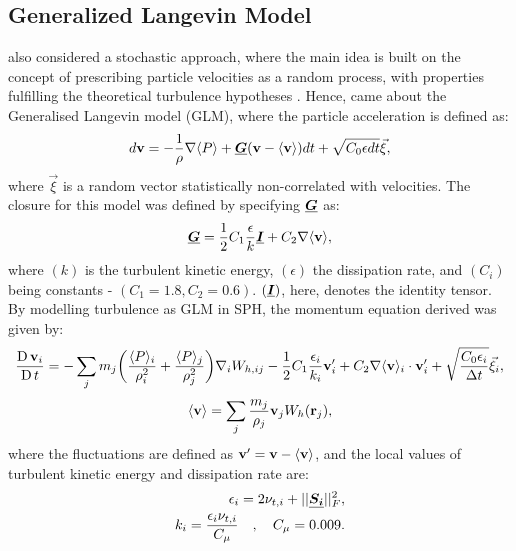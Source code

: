 \subsection{Generalized Langevin Model}
\cite{VIOLEAU2002} also considered a stochastic approach, where the main idea is built on the concept of prescribing particle velocities as a random process, with properties fulfilling the theoretical turbulence hypotheses \parencite{pope1994lagrangi}. Hence, came about the Generalised Langevin model (GLM), where the particle acceleration is defined as:
\begin{equation}
    d\mathbf{v} = -\frac{1}{\rho} \nabla \langle P \rangle + \underline{\bm{G}}(\mathbf{v} - \langle \mathbf{v} \rangle)dt + \sqrt{C_0 \epsilon dt}\Vec{\xi},
    \label{eq:violeau-glm-particle-accel}
\end{equation}
where $\Vec{\xi}$ is a random vector statistically non-correlated with velocities. The closure for this model was defined by specifying $\underline{\bm{G}}$ as:
\begin{equation}
    \underline{\bm{G}} = \frac{1}{2} C_1 \frac{\epsilon}{k}\underline{\bm{I}} + C_2 \nabla \langle \mathbf{v} \rangle,
\end{equation}
where $(k)$ is the turbulent kinetic energy, $(\epsilon)$ the dissipation rate, and $(C_i)$ being constants - $(C_1=1.8, C_2=0.6)$. $(\underline{\bm{I}})$, here, denotes the identity tensor.
By modelling turbulence as GLM in SPH, the momentum equation derived was given by:
\begin{equation}
    \frac{\operatorname{D} \mathbf{v}_i}{\operatorname{D} t} = -\sum_j m_j \bigg( \frac{\langle P \rangle_i}{\rho_i^2} + \frac{\langle P \rangle_j}{\rho_j^2} \bigg) \nabla_{i} W_{h, ij} - \frac{1}{2} C_1 \frac{\epsilon_i}{k_i} \mathbf{v}'_i + C_2 \nabla \langle \mathbf{v} \rangle_i \cdot \mathbf{v}'_i + \sqrt{\frac{C_0 \epsilon_i}{\Delta t}} \Vec{\xi}_i,
    \label{eq:violeau-mom-glm}
\end{equation}
\begin{equation}
    \langle \mathbf{v} \rangle = \sum_j \frac{m_j}{\rho_j}\mathbf{v}_j W_h (\mathbf{r}_j),
    \label{eq:violeau-ra-vel}
\end{equation}
where the fluctuations are defined as $\mathbf{v}' = \mathbf{v} - \langle \mathbf{v} \rangle$, and the local values of turbulent kinetic energy and dissipation rate are:
\begin{align}
    \epsilon_i = 2 \nu_{t, i} + 
    ||\underline{\bm{S_i}}||_F^2, \\
    k_i = \frac{\epsilon_i \nu_{t, i}}{C_{\mu}} \quad , \quad C_{\mu} = 0.009.
    \label{eq:violeau-k-eps}
\end{align}


